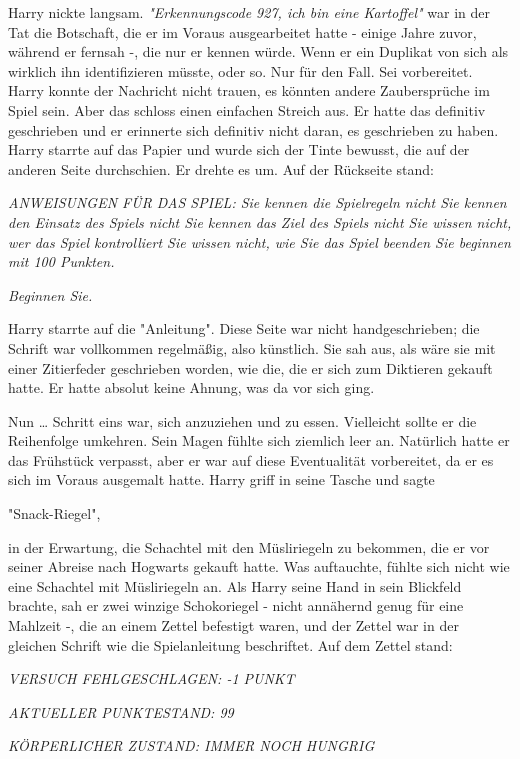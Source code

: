 {Harry nickte langsam. \emph{"Erkennungscode 927, ich bin eine Kartoffel"} war in der Tat die Botschaft, die er im Voraus ausgearbeitet hatte - einige Jahre zuvor, während er fernsah -, die nur er kennen würde. Wenn er ein Duplikat von sich als wirklich ihn identifizieren müsste, oder so. Nur für den Fall. Sei vorbereitet. Harry konnte der Nachricht nicht trauen, es könnten andere Zaubersprüche im Spiel sein. Aber das schloss einen einfachen Streich aus. Er hatte das definitiv geschrieben und er erinnerte sich definitiv nicht daran, es geschrieben zu haben. Harry starrte auf das Papier und wurde sich der Tinte bewusst, die auf der anderen Seite durchschien. Er drehte es um. Auf der Rückseite stand:

\emph{ANWEISUNGEN FÜR DAS SPIEL: Sie kennen die Spielregeln nicht Sie kennen den Einsatz des Spiels nicht Sie kennen das Ziel des Spiels nicht Sie wissen nicht, wer das Spiel kontrolliert Sie wissen nicht, wie Sie das Spiel beenden Sie beginnen mit 100 Punkten.}

\emph{Beginnen Sie.}

Harry starrte auf die "Anleitung". Diese Seite war nicht handgeschrieben; die Schrift war vollkommen regelmäßig, also künstlich. Sie sah aus, als wäre sie mit einer Zitierfeder geschrieben worden, wie die, die er sich zum Diktieren gekauft hatte. Er hatte absolut keine Ahnung, was da vor sich ging.

Nun … Schritt eins war, sich anzuziehen und zu essen. Vielleicht sollte er die Reihenfolge umkehren. Sein Magen fühlte sich ziemlich leer an. Natürlich hatte er das Frühstück verpasst, aber er war auf diese Eventualität vorbereitet, da er es sich im Voraus ausgemalt hatte. Harry griff in seine Tasche und sagte

"Snack-Riegel",

in der Erwartung, die Schachtel mit den Müsliriegeln zu bekommen, die er vor seiner Abreise nach Hogwarts gekauft hatte. Was auftauchte, fühlte sich nicht wie eine Schachtel mit Müsliriegeln an. Als Harry seine Hand in sein Blickfeld brachte, sah er zwei winzige Schokoriegel - nicht annähernd genug für eine Mahlzeit -, die an einem Zettel befestigt waren, und der Zettel war in der gleichen Schrift wie die Spielanleitung beschriftet. Auf dem Zettel stand:

\emph{VERSUCH FEHLGESCHLAGEN: -1 PUNKT}

\emph{AKTUELLER PUNKTESTAND: 99}

\emph{KÖRPERLICHER ZUSTAND: IMMER NOCH HUNGRIG}

}
